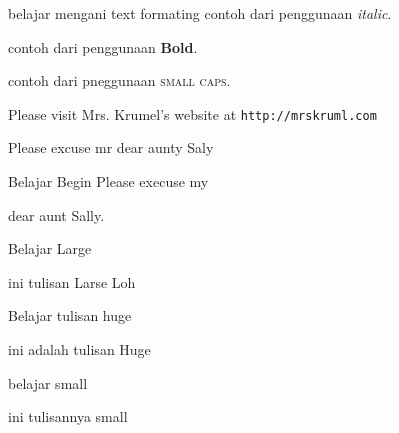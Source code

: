 \documentclass[12pt]{article}
\begin{document}
	belajar mengani text formating 
	contoh dari penggunaan \textit{italic}.
	
	contoh dari penggunaan \textbf{Bold}.
	
	contoh dari pneggunaan \textsc{small caps}.
	
	Please visit Mrs. Krumel's website at \texttt{http://mrskruml.com}
	
	Please excuse mr dear aunty Saly 
	
	Belajar Begin 
	Please execuse my \begin{large}
		dear aunt Sally.
	\end{large}
	
	Belajar Large \begin{LARGE}
		ini tulisan Larse Loh
	\end{LARGE}
	
	Belajar tulisan huge \begin{Huge}
		ini adalah tulisan Huge
	\end{Huge}
	
	belajar small \begin{small}
		ini tulisannya small	
	\end{small}	
\end{document}
